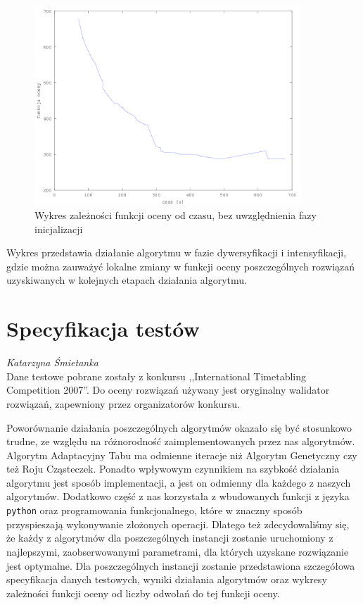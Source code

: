 \begin{figure}[H]
  
  \centering
    \includegraphics[width=10cm]{szczegolowy2_instancja.png}
    \caption{Wykres zależności funkcji oceny od czasu, bez uwzględnienia fazy inicjalizacji}
\end{figure}
Wykres przedstawia działanie algorytmu w fazie dywersyfikacji i intensyfikacji, gdzie można zauważyć lokalne zmiany w funkcji oceny poszczególnych rozwiązań uzyskiwanych w kolejnych etapach działania algorytmu.
\section{Specyfikacja testów}
\textit{Katarzyna Śmietanka} 
\\
Dane testowe pobrane zostały z konkursu ,,International Timetabling Competition 2007''. Do oceny rozwiązań używany jest oryginalny walidator rozwiązań, zapewniony przez organizatorów konkursu.
\par Poworównanie działania poszczególnych algorytmów okazało się być stosunkowo trudne, ze względu na różnorodność zaimplementowanych przez nas algorytmów. Algorytm Adaptacyjny Tabu ma odmienne iteracje niż Algorytm Genetyczny czy też Roju Cząsteczek. Ponadto wpływowym czynnikiem na szybkość działania algorytmu jest sposób implementacji, a jest on odmienny dla każdego z naszych algorytmów. Dodatkowo część z nas korzystała z wbudowanych funkcji z języka \verb#python# oraz programowania funkcjonalnego, które w znaczny sposób przyspieszają wykonywanie złożonych operacji. Dlatego też zdecydowaliśmy się, że każdy z algorytmów dla poszczególnych instancji zostanie uruchomiony z najlepszymi, zaobserwowanymi parametrami, dla których uzyskane rozwiązanie jest optymalne. Dla poszczególnych instancji zostanie przedstawiona szczegółowa specyfikacja danych testowych, wyniki działania algorytmów oraz wykresy zależności funkcji oceny od liczby odwołań do tej funkcji oceny.
